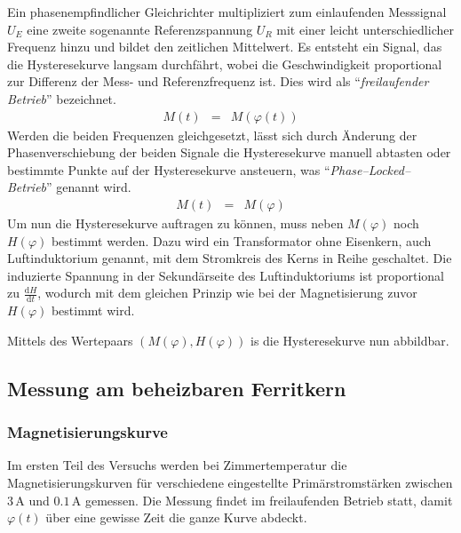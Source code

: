 \documentclass[12pt,a4paper]{scrartcl}
\numberwithin{equation}{section} %
\begin{document}
\hypertarget{bestimmung-von-mvarphi}{\label{bestimmung-von-mvarphi}}
Ein phasenempfindlicher Gleichrichter multipliziert zum einlaufenden Messsignal $U_E$ eine zweite sogenannte Referenzspannung $U_R$ mit einer leicht unterschiedlicher Frequenz hinzu und bildet den zeitlichen Mittelwert. Es entsteht ein Signal, das die Hysteresekurve langsam durchfährt, wobei die Geschwindigkeit proportional zur Differenz der Mess- und Referenzfrequenz ist. Dies wird als ``\emph{freilaufender Betrieb}'' bezeichnet.
\begin{eqnarray}
    M(t) &=& M(\varphi(t))
\end{eqnarray}
Werden die beiden Frequenzen gleichgesetzt, lässt sich durch Änderung der Phasenverschiebung der beiden Signale die Hysteresekurve manuell abtasten oder bestimmte Punkte auf der Hysteresekurve ansteuern, was ``\emph{Phase--Locked--Betrieb}'' genannt wird.
\begin{eqnarray}
    M(t) &=& M(\varphi)
\end{eqnarray}
\hypertarget{bestimmung-von-hvarphi}{\label{bestimmung-von-hvarphi}}Um nun die Hysteresekurve auftragen zu können, muss neben $M(\varphi)$ noch $H(\varphi)$ bestimmt werden. Dazu wird ein Transformator ohne Eisenkern, auch Luftinduktorium genannt, mit dem Stromkreis des Kerns in Reihe geschaltet. Die induzierte Spannung in der Sekundärseite des Luftinduktoriums ist proportional zu $\frac{\mathrm dH}{\mathrm dt}$, wodurch mit dem gleichen Prinzip wie bei der Magnetisierung zuvor $H(\varphi)$ bestimmt wird.

Mittels des Wertepaars $(M(\varphi), H(\varphi))$ is die Hysteresekurve nun abbildbar.

\hypertarget{messung-am-beheizbaren-ferritkern}{%
\subsection{Messung am beheizbaren Ferritkern}\label{messung-am-beheizbaren-ferritkern}}

\hypertarget{magnetisierungskurve}{%
\subsubsection{Magnetisierungskurve}\label{magnetisierungskurve}}
Im ersten Teil des Versuchs werden bei Zimmertemperatur die Magnetisierungskurven für verschiedene eingestellte Primärstromstärken zwischen $3\,\mathrm A$ und $0.1\,\mathrm A$ gemessen. Die Messung findet im freilaufenden Betrieb statt, damit $\varphi(t)$ über eine gewisse Zeit die ganze Kurve abdeckt.
\end{document}
